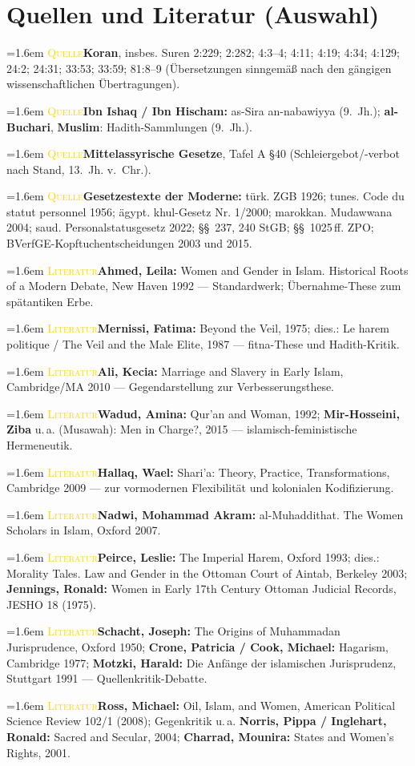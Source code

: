\documentclass[11pt,a4paper,ngerman]{scrartcl}
\newcommand{\litentry}[2]{\par\noindent\hangindent=1.6em\hangafter=1
  {\footnotesize\scshape\textcolor{gold}{#1}}\quad #2\par\smallskip}
\begin{document}
\section{Quellen und Literatur (Auswahl)}
\litentry{Quelle}{\textbf{Koran}, insbes. Suren 2:229; 2:282; 4:3--4; 4:11; 4:19; 4:34; 4:129; 24:2; 24:31; 33:53; 33:59; 81:8--9 (Übersetzungen sinngemäß nach den gängigen wissenschaftlichen Übertragungen).}
\litentry{Quelle}{\textbf{Ibn Ishaq / Ibn Hischam:} as-Sira an-nabawiyya (9.~Jh.); \textbf{al-Buchari}, \textbf{Muslim}: Hadith-Sammlungen (9.~Jh.).}
\litentry{Quelle}{\textbf{Mittelassyrische Gesetze}, Tafel A \S 40 (Schleiergebot/-verbot nach Stand, 13.~Jh. v.~Chr.).}
\litentry{Quelle}{\textbf{Gesetzestexte der Moderne:} türk. ZGB 1926; tunes. Code du statut personnel 1956; ägypt. khul-Gesetz Nr. 1/2000; marokkan. Mudawwana 2004; saud. Personalstatusgesetz 2022; \S\S~237, 240 StGB; \S\S~1025\,ff. ZPO; BVerfGE-Kopftuchentscheidungen 2003 und 2015.}
\litentry{Literatur}{\textbf{Ahmed, Leila:} Women and Gender in Islam. Historical Roots of a Modern Debate, New Haven 1992 --- Standardwerk; Übernahme-These zum spätantiken Erbe.}
\litentry{Literatur}{\textbf{Mernissi, Fatima:} Beyond the Veil, 1975; dies.: Le harem politique / The Veil and the Male Elite, 1987 --- fitna-These und Hadith-Kritik.}
\litentry{Literatur}{\textbf{Ali, Kecia:} Marriage and Slavery in Early Islam, Cambridge/MA 2010 --- Gegendarstellung zur Verbesserungsthese.}
\litentry{Literatur}{\textbf{Wadud, Amina:} Qur'an and Woman, 1992; \textbf{Mir-Hosseini, Ziba} u.\,a. (Musawah): Men in Charge?, 2015 --- islamisch-feministische Hermeneutik.}
\litentry{Literatur}{\textbf{Hallaq, Wael:} Shari'a: Theory, Practice, Transformations, Cambridge 2009 --- zur vormodernen Flexibilität und kolonialen Kodifizierung.}
\litentry{Literatur}{\textbf{Nadwi, Mohammad Akram:} al-Muhaddithat. The Women Scholars in Islam, Oxford 2007.}
\litentry{Literatur}{\textbf{Peirce, Leslie:} The Imperial Harem, Oxford 1993; dies.: Morality Tales. Law and Gender in the Ottoman Court of Aintab, Berkeley 2003; \textbf{Jennings, Ronald:} Women in Early 17th Century Ottoman Judicial Records, JESHO 18 (1975).}
\litentry{Literatur}{\textbf{Schacht, Joseph:} The Origins of Muhammadan Jurisprudence, Oxford 1950; \textbf{Crone, Patricia / Cook, Michael:} Hagarism, Cambridge 1977; \textbf{Motzki, Harald:} Die Anfänge der islamischen Jurisprudenz, Stuttgart 1991 --- Quellenkritik-Debatte.}
\litentry{Literatur}{\textbf{Ross, Michael:} Oil, Islam, and Women, American Political Science Review 102/1 (2008); Gegenkritik u.\,a. \textbf{Norris, Pippa / Inglehart, Ronald:} Sacred and Secular, 2004; \textbf{Charrad, Mounira:} States and Women's Rights, 2001.}
\end{document}
